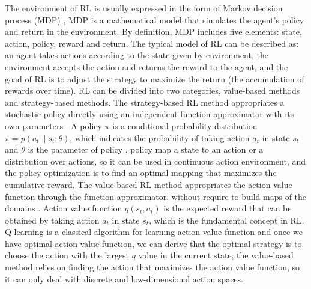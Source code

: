 \documentclass[journal]{IEEEtran}
\begin{document}
The environment of RL is usually expressed in the form of Markov decision process (MDP) \cite{van2012reinforcement},
MDP is a mathematical model that simulates the agent's policy and return in the environment.
By definition, MDP includes five elements: state, action, policy, reward and return.
% 
The typical model of RL can be described as: an agent takes actions according to the state given by environment, the environment accepts the action and returns the reward to the agent, and the goad of RL is to adjust the strategy to maximize the return (the accumulation of rewards over time).
RL can be divided into two categories, value-based methods and strategy-based methods.
The strategy-based RL method appropriates a stochastic policy directly using an independent function approximator with its own parameters \cite{sutton1999policy}.
A policy $\pi$ is a conditional probability distribution $\pi = p(a_t\| s_t; \theta)$, which indicates the probability of taking action $a_t$ in state $s_t$ and $\theta$ is the parameter of policy \cite{sun2021learning}, policy map a state to an action or a distribution over actions, so it can be used in continuous action environment, and the policy optimization is to find an optimal mapping that maximizes the cumulative reward.
The value-based RL method appropriates the action value function through the function approximator, without require to build maps of the domains \cite{dearden1998bayesian}.
Action value function $q(s_t,a_t)$ is the expected reward that can be obtained by taking action $a_t$ in state $s_t$, which is the fundamental concept in RL. Q-learning \cite{watkins1992q} is a classical algorithm for learning action value function and once we have optimal action value function, we can derive that the optimal strategy is to choose the action with the largest $q$ value in the current state,
the value-based method relies on finding the action that maximizes the action value function, so it can only deal with discrete and low-dimensional action spaces.
\end{document}

